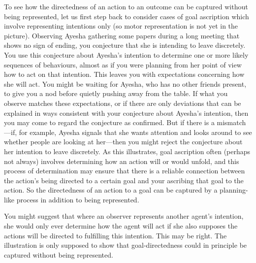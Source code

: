 \documentclass[12pt,\papersize]{extarticle}
\begin{document}
To see how the directedness of an action to an outcome can be captured without being represented, let us first step back to consider cases of goal ascription which involve representing intentions only (so motor representation is not yet in the picture). Observing Ayesha gathering some papers during a long meeting that shows no sign of ending, you conjecture that she is intending to leave discretely. You use this conjecture about Ayesha's intention to determine one or more likely sequences of behaviours, almost as if you were planning from her point of view how to act on that intention. This leaves you with expectations concerning how she will act. You might be waiting for Ayesha, who has no other friends present, to give you a nod before quietly pushing away from the table. If what you observe matches these expectations, or if there are only deviations that can be explained in ways consistent with your conjecture about Ayesha's intention, then you may come to regard the conjecture as confirmed. But if there is a mismatch---if, for example, Ayesha signals that she wants attention and looks around to see whether people are looking at her---then you might reject the conjecture about her intention to leave discretely. As this illustrates, goal ascription often (perhaps not always) involves determining how an action will or would unfold, and this process of determination may ensure that there is a reliable connection between the action's being directed to a certain goal and your ascribing that goal to the action. So the directedness of an action to a goal can be captured by a planning-like process in addition to being represented.

You might suggest that where an observer represents another agent's intention, she would only ever determine how the agent will act if she also supposes the actions will be directed to fulfilling this intention.  This may be right.  The illustration is only supposed to show that goal-directedness could in principle be captured without being represented.
\end{document}
